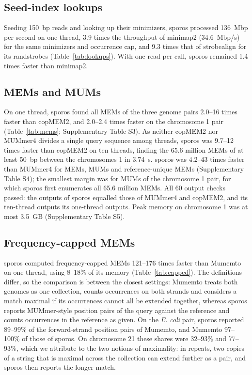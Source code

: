 

\subsection{Seed-index lookups}

Seeding 150~bp reads and looking up their minimizers, sporos processed 136~Mbp per second on one thread, 3.9 times the throughput of minimap2 (34.6~Mbp/s) for the same minimizers and occurrence cap, and 9.3 times that of strobealign for its randstrobes (Table~\ref{tab:lookups}). With one read per call, sporos remained 1.4 times faster than minimap2.



\subsection{MEMs and MUMs}

On one thread, sporos found all MEMs of the three genome pairs 2.0--16 times faster than copMEM2, and 2.0--2.4 times faster on the chromosome 1 pair (Table~\ref{tab:mems}; Supplementary Table S3). As neither copMEM2 nor MUMmer4 divides a single query sequence among threads, sporos was 9.7--12 times faster than copMEM2 on ten threads, finding the 65.6 million MEMs of at least 50~bp between the chromosomes 1 in 3.74~s. sporos was 4.2--43 times faster than MUMmer4 for MEMs, MUMs and reference-unique MEMs (Supplementary Table S4); the smallest margin was for MUMs of the chromosome 1 pair, for which sporos first enumerates all 65.6 million MEMs. All 60 output checks passed: the outputs of sporos equalled those of MUMmer4 and copMEM2, and its ten-thread outputs its one-thread outputs. Peak memory on chromosome 1 was at most 3.5~GB (Supplementary Table S5).



\subsection{Frequency-capped MEMs}

sporos computed frequency-capped MEMs 121--176 times faster than Mumemto on one thread, using 8--18\% of its memory (Table~\ref{tab:capped}). The definitions differ, so the comparison is between the closest settings: Mumemto treats both genomes as one collection, counts occurrences on both strands and considers a match maximal if its occurrences cannot all be extended together, whereas sporos reports MUMmer-style position pairs of the query against the reference and counts occurrences in the reference as given. On the \emph{E. coli} pair, sporos reported 89--99\% of the forward-strand position pairs of Mumemto, and Mumemto 97--100\% of those of sporos. On chromosome 21 these shares were 32--93\% and 77--93\%, which we attribute to the two notions of maximality: in repeats, two copies of a string that is maximal across the collection can extend further as a pair, and sporos then reports the longer match.

